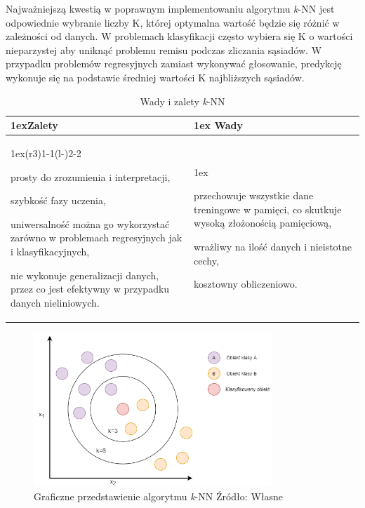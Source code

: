 Najważniejszą kwestią w poprawnym implementowaniu algorytmu \textit{k}-NN jest odpowiednie wybranie liczby
K, której optymalna wartość będzie się różnić w zależności od danych. W problemach 
klasyfikacji często wybiera się K o wartości nieparzystej aby uniknąć problemu remisu
podczas zliczania sąsiadów. W przypadku problemów regresyjnych zamiast wykonywać głosowanie,
predykcję wykonuje się na podstawie średniej wartości K najbliższych sąsiadów.

\begin{table}[h]
    \begin{tabularx}{\linewidth}{>{\parskip1ex}X@{\kern4\tabcolsep}>{\parskip1ex}X}
    \toprule
    \hfil\bfseries Zalety
    &
    \hfil\bfseries Wady
    \\\cmidrule(r{3\tabcolsep}){1-1}\cmidrule(l{-\tabcolsep}){2-2}
    
    prosty do zrozumienia i interpretacji,\par
    szybkość fazy uczenia,\par
    uniwersalność można go wykorzystać zarówno w problemach regresyjnych jak i klasyfikacyjnych,\par
    nie wykonuje generalizacji danych, przez co jest efektywny w przypadku danych nieliniowych.\par
    &
    
    przechowuje wszystkie dane treningowe w pamięci, co skutkuje wysoką złożonością pamięciową,\par
    wrażliwy na ilość danych i nieistotne cechy,\par
    kosztowny obliczeniowo.\par
    \\\bottomrule
    \end{tabularx}
    \caption{Wady i zalety \textit{k}-NN}
\end{table}
    

\begin{figure}[h]
    \centering
    \includegraphics[width=0.8\textwidth]{./Img/KNN.png}
    \caption{Graficzne przedstawienie algorytmu \textit{k}-NN Źródło: Własne}
\end{figure}

